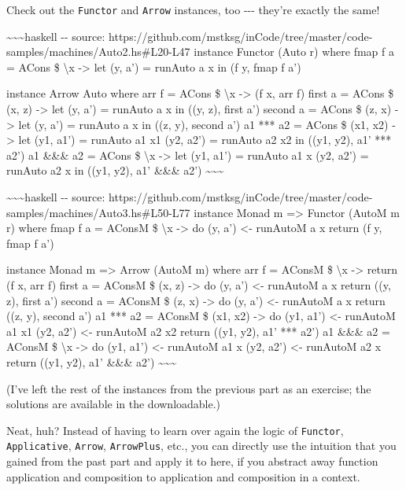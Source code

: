 \documentclass[]{article}
\begin{document}
Check out the \texttt{Functor} and \texttt{Arrow} instances, too -\/-\/- they're
exactly the same!

\textasciitilde{}\textasciitilde{}\textasciitilde{}haskell -\/- source:
https://github.com/mstksg/inCode/tree/master/code-samples/machines/Auto2.hs\#L20-L47
instance Functor (Auto r) where fmap f a = ACons \$ \textbackslash{}x
-\textgreater{} let (y, a') = runAuto a x in (f y, fmap f a')

instance Arrow Auto where arr f = ACons \$ \textbackslash{}x -\textgreater{} (f
x, arr f) first a = ACons \$ (x, z) -\textgreater{} let (y, a') = runAuto a x in
((y, z), first a') second a = ACons \$ (z, x) -\textgreater{} let (y, a') =
runAuto a x in ((z, y), second a') a1 *** a2 = ACons \$ (x1, x2) -\textgreater{}
let (y1, a1') = runAuto a1 x1 (y2, a2') = runAuto a2 x2 in ((y1, y2), a1' ***
a2') a1 \&\&\& a2 = ACons \$ \textbackslash{}x -\textgreater{} let (y1, a1') =
runAuto a1 x (y2, a2') = runAuto a2 x in ((y1, y2), a1' \&\&\& a2')
\textasciitilde{}\textasciitilde{}\textasciitilde{}

\textasciitilde{}\textasciitilde{}\textasciitilde{}haskell -\/- source:
https://github.com/mstksg/inCode/tree/master/code-samples/machines/Auto3.hs\#L50-L77
instance Monad m =\textgreater{} Functor (AutoM m r) where fmap f a = AConsM \$
\textbackslash{}x -\textgreater{} do (y, a') \textless{}- runAutoM a x return (f
y, fmap f a')

instance Monad m =\textgreater{} Arrow (AutoM m) where arr f = AConsM \$
\textbackslash{}x -\textgreater{} return (f x, arr f) first a = AConsM \$ (x, z)
-\textgreater{} do (y, a') \textless{}- runAutoM a x return ((y, z), first a')
second a = AConsM \$ (z, x) -\textgreater{} do (y, a') \textless{}- runAutoM a x
return ((z, y), second a') a1 *** a2 = AConsM \$ (x1, x2) -\textgreater{} do
(y1, a1') \textless{}- runAutoM a1 x1 (y2, a2') \textless{}- runAutoM a2 x2
return ((y1, y2), a1' *** a2') a1 \&\&\& a2 = AConsM \$ \textbackslash{}x
-\textgreater{} do (y1, a1') \textless{}- runAutoM a1 x (y2, a2') \textless{}-
runAutoM a2 x return ((y1, y2), a1' \&\&\& a2')
\textasciitilde{}\textasciitilde{}\textasciitilde{}

(I've left the rest of the instances from the previous part as an exercise; the
solutions are available in the downloadable.)

Neat, huh? Instead of having to learn over again the logic of \texttt{Functor},
\texttt{Applicative}, \texttt{Arrow}, \texttt{ArrowPlus}, etc., you can directly
use the intuition that you gained from the past part and apply it to here, if
you abstract away function application and composition to application and
composition in a context.
\end{document}
